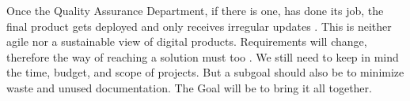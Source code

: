 Once the Quality Assurance Department, if there is one, has done its job, the final product gets deployed and only receives irregular updates \citep{ratcliffe2011agile:18}. This is neither agile nor a sustainable view of digital products. \newline
Requirements will change, therefore the way of reaching a solution must too \citep{ratcliffe2011agile:30:31}.  
\newline \newline 
We still need to keep in mind the time, budget, and scope of projects. But a subgoal should also be to minimize waste and unused documentation. The Goal will be to bring it all together.